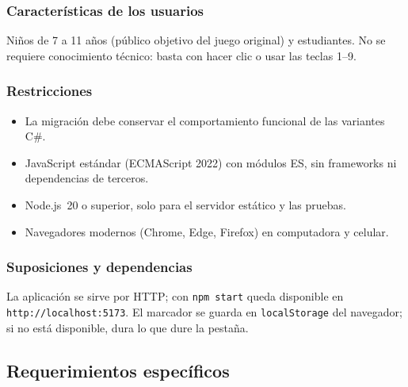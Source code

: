 \documentclass[12pt,a4paper]{article}
\begin{document}
\subsubsection{Características de los usuarios}
Niños de 7 a 11 años (público objetivo del juego original) y estudiantes.
No se requiere conocimiento técnico: basta con hacer clic o usar las teclas 1--9.

\subsubsection{Restricciones}
\begin{itemize}
  \item La migración debe conservar el comportamiento funcional de las variantes C\#.
  \item JavaScript estándar (ECMAScript 2022) con módulos ES, sin frameworks ni dependencias de terceros.
  \item Node.js~20 o superior, solo para el servidor estático y las pruebas.
  \item Navegadores modernos (Chrome, Edge, Firefox) en computadora y celular.
\end{itemize}

\subsubsection{Suposiciones y dependencias}
La aplicación se sirve por HTTP; con \texttt{npm start} queda disponible en
\texttt{http://localhost:5173}. El marcador se guarda en \texttt{localStorage}
del navegador; si no está disponible, dura lo que dure la pestaña.

\subsection{Requerimientos específicos}
\end{document}
